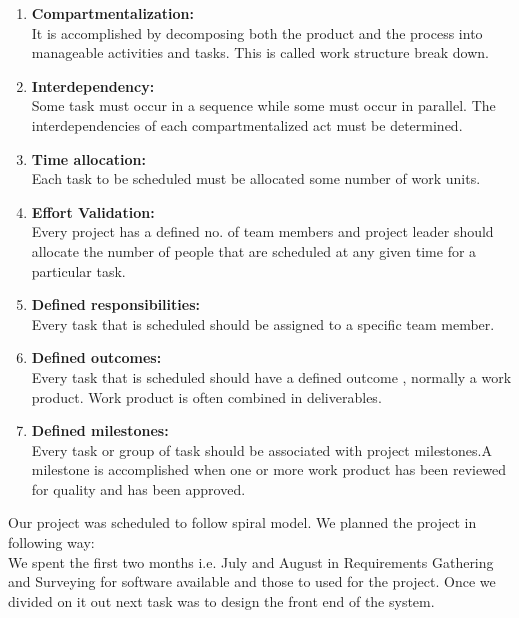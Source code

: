 \begin{enumerate}
 \item \textbf{Compartmentalization:}\\\hspace*{0.82cm}It is accomplished by  decomposing both the product and the process into 
manageable activities and tasks. This is called work structure break down. 
 \item \textbf{Interdependency:}\\\hspace*{0.82cm}Some task must occur in a sequence while some must occur in parallel. The 
interdependencies of each compartmentalized act must be determined. 
 \item \textbf{Time allocation:}\\\hspace*{0.82cm}Each task to be scheduled must be allocated some number of work units. 
 \item \textbf{Effort Validation:}\\\hspace*{0.82cm}Every project has a defined no. of team members and project leader should 
allocate the number of people that are scheduled at any given time for a particular task. 
 \item \textbf{Defined responsibilities:}\\\hspace*{0.82cm}Every task  that is scheduled should be assigned to a specific team member. 
 \item \textbf{Defined outcomes:}\\\hspace*{0.82cm}Every task that is scheduled should have a defined outcome , normally a work 
product. Work product is often combined in deliverables. 
 \item \textbf{Defined milestones:}\\\hspace*{0.82cm}Every task or group of task should be associated with project milestones.A 
milestone is accomplished when one or more work product has been reviewed for quality and has been approved.
\end{enumerate}

Our project was scheduled to follow spiral model. We planned the project in following way:\\
\hspace*{0.82cm}We spent the first two months i.e. July and August in Requirements Gathering and Surveying for software available 
and those to used for the project. Once we divided on it out next task was to design the front end of the system.

